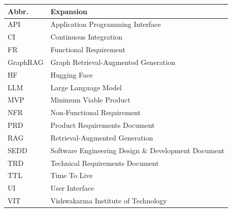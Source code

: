 \documentclass[12pt,a4paper]{report}
\begin{document}
\begin{tabularx}{\textwidth}{@{}lX@{}}
\toprule
\textbf{Abbr.} & \textbf{Expansion} \\
\midrule
API & Application Programming Interface \\
CI & Continuous Integration \\
FR & Functional Requirement \\
GraphRAG & Graph Retrieval-Augmented Generation \\
HF & Hugging Face \\
LLM & Large Language Model \\
MVP & Minimum Viable Product \\
NFR & Non-Functional Requirement \\
PRD & Product Requirements Document \\
RAG & Retrieval-Augmented Generation \\
SEDD & Software Engineering Design \& Development Document \\
TRD & Technical Requirements Document \\
TTL & Time To Live \\
UI & User Interface \\
VIT & Vishwakarma Institute of Technology \\
\bottomrule
\end{tabularx}

\newpage

\setcounter{page}{1}













\begin{appendices}

\end{appendices}
\end{document}

